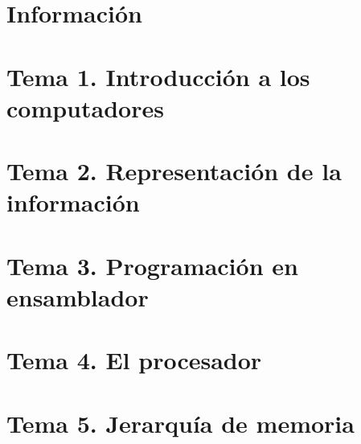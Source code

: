 \documentclass[12pt, twoside, openright]{report} %
\begin{document}





\part{Información}



\part{Tema 1. Introducción a los computadores}



\part{Tema 2. Representación de la información}




\part{Tema 3. Programación en ensamblador}







\part{Tema 4. El procesador}




\part{Tema 5. Jerarquía de memoria}



\end{document}
